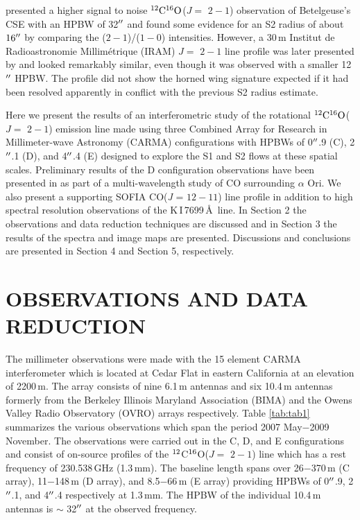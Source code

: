 \documentclass[iop]{emulateapj}
\begin{document}
\cite{1987ApJ...313..400H} presented a higher signal to noise $\rm{{}^{12}C^{16}O}$($J=$ $2-1$) observation of Betelgeuse's CSE with an HPBW of 32$\mbox{$^{\prime\prime}$}$ and found some evidence for an S2 radius of about $16\mbox{$^{\prime\prime}$}$ by comparing the  ($2-1$)/($1-0$) intensities. However,  a 30\,m Institut de Radioastronomie Millim\'etrique (IRAM) $J=$ $2-1$ line profile was later presented by  \cite{1994ApJ...424L.127H} and looked remarkably similar, even though it was observed with a smaller 12$\mbox{$^{\prime\prime}$}$ HPBW. The profile did not show the horned wing signature expected if it had been resolved apparently in conflict with the previous S2 radius estimate.

Here we present the results of an interferometric study of the rotational $\rm{{}^{12}C^{16}O}$($J=$ $2-1$) emission line made using three Combined Array for Research in Millimeter-wave Astronomy (CARMA) configurations with HPBWs of 0$\mbox{$^{\prime\prime}$}$.9 (C), 2$\mbox{$^{\prime\prime}$}$.1 (D), and 4$\mbox{$^{\prime\prime}$}$.4 (E) designed to explore the S1 and S2 flows at these spatial scales. Preliminary results of the D configuration observations have been presented in \cite{2009AIPC.1094..868H} as part of a multi-wavelength study of CO surrounding $\alpha$ Ori. We also present a supporting SOFIA CO(\textit{J} = $12-11$) line profile in addition to high spectral resolution observations of the K\,I\,7699\,\AA \ line. In Section 2 the observations and data reduction techniques are discussed and in Section 3 the results of the spectra and image maps are presented. Discussions and conclusions are presented in Section 4 and Section 5, respectively.

\section{OBSERVATIONS AND DATA REDUCTION}

The millimeter observations were made with the 15 element CARMA interferometer \citep{2004ASPC..314..768S} which is located at Cedar Flat in eastern California at an elevation of 2200\,m. The array consists of nine 6.1\,m antennas and six 10.4\,m antennas formerly from the Berkeley Illinois Maryland Association (BIMA) and the Owens Valley Radio Observatory (OVRO) arrays respectively. Table \ref{tab:tab1} summarizes the various observations which span the period 2007 May$-$2009 November. The observations were carried out in the C, D, and E configurations and consist of on-source profiles of the $\rm{{}^{12}}$C$\rm{{}^{16}}$O($J=$ $2-1$) line which has a rest frequency of 230.538\,GHz (1.3\,mm). The baseline length spans over 26$-$370\,m (C array), 11$-$148\,m (D array), and 8.5$-$66\,m (E array) providing HPBWs of 0$\mbox{$^{\prime\prime}$}$.9, 2$\mbox{$^{\prime\prime}$}$.1, and 4$\mbox{$^{\prime\prime}$}$.4 respectively at 1.3\,mm. The HPBW of the individual 10.4\,m antennas is $\sim$ 32$\mbox{$^{\prime\prime}$}$ at the observed frequency.
\end{document}
